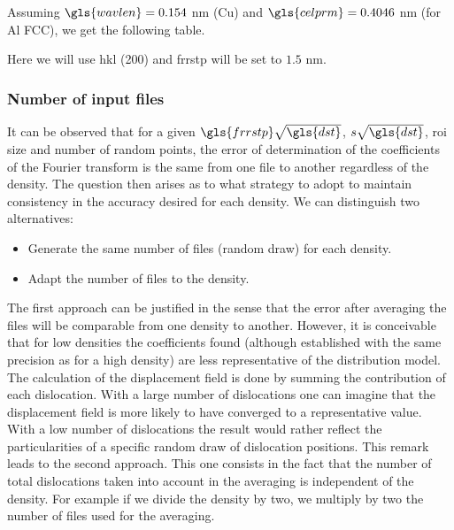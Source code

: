 Assuming \( \gls{wavlen} = 0.154 \) nm (Cu) and \( \gls{celprm} =  0.4046 \) nm  (for Al FCC), we get the following table.

\medskip

{\renewcommand{\arraystretch}{1.6}




\bigskip

Here we will use hkl (200) and \gls{frrstp} will be set to \( 1.5 \) nm.

\subsubsection{Number of input files}

It can be observed that for a given \( \gls{frrstp} \sqrt{\gls{dst}} \), \( s \sqrt{\gls{dst}} \), \gls{roi} size and number of random points, the error of determination of the coefficients of the Fourier transform is the same from one file to another regardless of the density.
The question then arises as to what strategy to adopt to maintain consistency in the accuracy desired for each density.
We can distinguish two alternatives:
\begin{itemize}
\item Generate the same number of files (random draw) for each density.
\item Adapt the number of files to the density.
\end{itemize}
The first approach can be justified in the sense that the error after averaging the files will be comparable from one density to another.
However, it is conceivable that for low densities the coefficients found (although established with the same precision as for a high density) are less representative of the distribution model.
The calculation of the displacement field is done by summing the contribution of each dislocation.
With a large number of dislocations one can imagine that the displacement field is more likely to have converged to a representative value.
With a low number of dislocations the result would rather reflect the particularities of a specific random draw of dislocation positions.
This remark leads to the second approach.
This one consists in the fact that the number of total dislocations taken into account in the averaging is independent of the density.
For example if we divide the density by two, we multiply by two the number of files used for the averaging.

}
